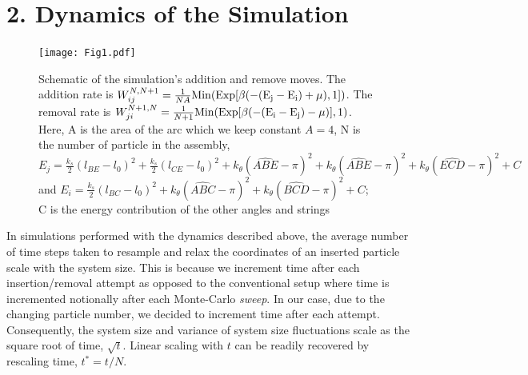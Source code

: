 \documentclass[amsmath,preprintnumbers,10pt,nofootinbib,prl,twocolumn]{revtex4-1}
\begin{document}
\section{2. Dynamics of the Simulation}
\begin{figure}[tbp]
\texttt{[image: Fig1.pdf]}
\caption{ Schematic of the simulation's addition and remove moves. The addition rate is $W_{ij}^{N,N+1}=\frac{1}{NA} \rm{Min}(\rm{Exp}[\beta(-(E_j-E_i) +\mu),1])$. The removal rate is $W_{ji}^{N+1,N}=\frac{1}{N+1}\rm{Min}(\rm{Exp}[\beta(-(E_i-E_j) -\mu)],1)$. Here, A is the area of the arc which we keep constant $A=4$, N is the number of particle in the assembly, $E_j = \frac{k_s}{2}(l_{BE}-l_0)^2+\frac{k_s}{2}(l_{CE}-l_0)^2+k_\theta(\widehat{ABE}-\pi)^2+k_\theta(\widehat{ABE}-\pi)^2+k_\theta(\widehat{ECD}-\pi)^2+C$ and $E_i=\frac{k_s}{2}(l_{BC}-l_0)^2+k_\theta(\widehat{ABC}-\pi)^2+k_\theta(\widehat{BCD}-\pi)^2+C$; C is the energy contribution of the other angles and strings }
\label{fig:SimulationSchematic}
\end{figure}
In simulations performed with the dynamics described above, the average number of time steps taken to resample and relax the coordinates of an inserted particle scale with the system size. This is because we increment time after each insertion/removal attempt as opposed to the conventional setup where time is incremented notionally after each Monte-Carlo {\it sweep}. In our case, due to the changing particle number, we decided to increment time after each attempt. Consequently, the system size and variance of system size fluctuations scale as the square root of time, $\sqrt{t}$. Linear scaling with $t$ can be readily recovered by rescaling time, $t^*=t/N$.

\end{document}
